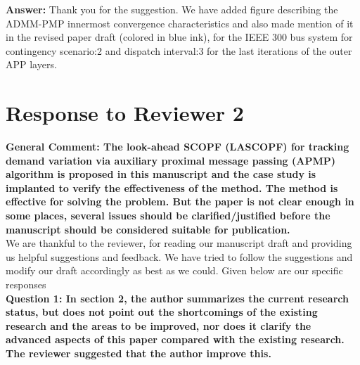 \documentclass[8pt]{article}
\begin{document}
\textbf{Answer: }Thank you for the suggestion. We have added figure describing the ADMM-PMP innermost convergence characteristics and also made mention of it in the revised paper draft (colored in blue ink), for the IEEE 300 bus system for contingency scenario:2 and dispatch interval:3 for the last iterations of the outer APP layers.\\



\section{Response to Reviewer 2}
\noindent\textbf{General Comment: The look-ahead SCOPF (LASCOPF) for tracking demand variation via auxiliary proximal message passing (APMP) algorithm is proposed in this manuscript and the case study is implanted to verify the effectiveness of the method. The method is effective for solving the problem. But the paper is not clear enough in some places, several issues should be clarified/justified before the manuscript should be considered suitable for publication.}\\

We are thankful to the reviewer, for reading our manuscript draft and providing us helpful suggestions and feedback. We have tried to follow the suggestions and modify our draft accordingly as best as we could. Given below are our specific responses\\

\textbf{Question 1: In section 2, the author summarizes the current research status, but does not point out the shortcomings of the existing research and the areas to be improved, nor does it clarify the advanced aspects of this paper compared with the existing research. The reviewer suggested that the author improve this.}\\
\end{document}
